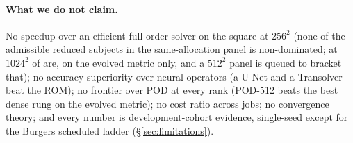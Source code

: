 
\paragraph{What we do not claim.} No speedup over an efficient full-order
solver on the square at $256^2$ (none of the \nPanelReducedCount{} admissible
reduced subjects in the same-allocation panel is non-dominated; at $1024^2$
\nPanelTenTwentyFourReducedNonDomEvolved{} of
\nPanelTenTwentyFourReducedCount{} are, on the evolved metric only, and a
$512^2$ panel is queued to bracket that); no accuracy superiority over neural
operators (a U-Net and a Transolver beat the ROM); no frontier over POD at
every rank (POD-512 beats the best dense rung on the evolved metric); no cost
ratio across jobs; no convergence theory; and every number is
development-cohort evidence, single-seed except for the Burgers scheduled
ladder (\S\ref{sec:limitations}).
